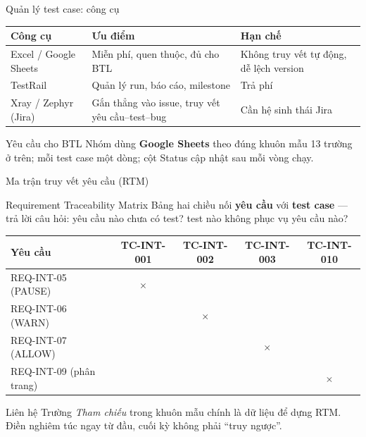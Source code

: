 \documentclass[aspectratio=169,12pt]{beamer}
\begin{document}
\begin{frame}{Quản lý test case: công cụ}
  \begin{center}
  \small
  \setlength{\tabcolsep}{4pt}
  \begin{tabular}{p{3.1cm}p{4.2cm}p{4.2cm}}
    \toprule
    \textbf{Công cụ} & \textbf{Ưu điểm} & \textbf{Hạn chế} \\
    \midrule
    Excel / Google Sheets & Miễn phí, quen thuộc, đủ cho BTL & Không truy vết tự động, dễ lệch version \\
    TestRail & Quản lý run, báo cáo, milestone & Trả phí \\
    Xray / Zephyr (Jira) & Gắn thẳng vào issue, truy vết yêu cầu--test--bug & Cần hệ sinh thái Jira \\
    \bottomrule
  \end{tabular}
  \end{center}

  \begin{block}{Yêu cầu cho BTL}
    Nhóm dùng \textbf{Google Sheets} theo đúng khuôn mẫu 13 trường ở trên;
    mỗi test case một dòng; cột Status cập nhật sau mỗi vòng chạy.
  \end{block}
\end{frame}

\begin{frame}{Ma trận truy vết yêu cầu (RTM)}
  \begin{block}{Requirement Traceability Matrix}
    Bảng hai chiều nối \textbf{yêu cầu} với \textbf{test case} --- trả lời câu hỏi:
    yêu cầu nào chưa có test? test nào không phục vụ yêu cầu nào?
  \end{block}

  \begin{center}
  \small
  \setlength{\tabcolsep}{4pt}
  \begin{tabular}{lcccc}
    \toprule
    \textbf{Yêu cầu} & TC-INT-001 & TC-INT-002 & TC-INT-003 & TC-INT-010 \\
    \midrule
    REQ-INT-05 (PAUSE)      & \(\times\) & & & \\
    REQ-INT-06 (WARN)       & & \(\times\) & & \\
    REQ-INT-07 (ALLOW)      & & & \(\times\) & \\
    REQ-INT-09 (phân trang) & & & & \(\times\) \\
    \bottomrule
  \end{tabular}
  \end{center}

  \begin{exampleblock}{Liên hệ}
    Trường \emph{Tham chiếu} trong khuôn mẫu chính là dữ liệu để dựng RTM.
    Điền nghiêm túc ngay từ đầu, cuối kỳ không phải ``truy ngược''.
  \end{exampleblock}
\end{frame}
\end{document}
